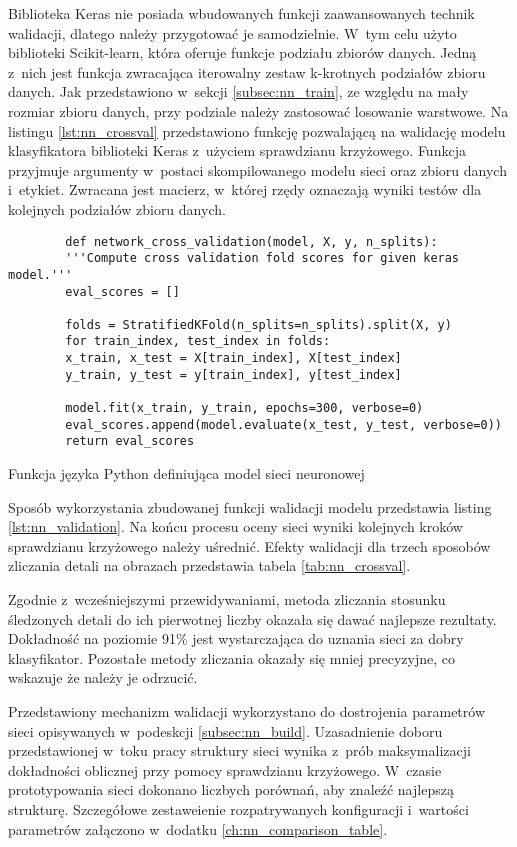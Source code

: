 Biblioteka Keras nie posiada wbudowanych funkcji zaawansowanych technik
walidacji, dlatego należy przygotować je samodzielnie.
W~tym celu użyto biblioteki Scikit-learn, która oferuje funkcje podziału
zbiorów danych.
Jedną z~nich jest funkcja zwracająca iterowalny zestaw k-krotnych
podziałów zbioru danych.
Jak przedstawiono w~sekcji \ref{subsec:nn_train}, ze względu na mały rozmiar
zbioru danych, przy podziale należy zastosować losowanie warstwowe.
Na listingu \ref{lst:nn_crossval} przedstawiono funkcję pozwalającą na
walidację modelu klasyfikatora biblioteki Keras z~użyciem sprawdzianu
krzyżowego.
Funkcja przyjmuje argumenty w~postaci skompilowanego modelu sieci oraz
zbioru danych i~etykiet.
Zwracana jest macierz, w~której rzędy oznaczają wyniki testów dla kolejnych
podziałów zbioru danych.
\begin{listing}[htb]
	\begin{verbatim}
		def network_cross_validation(model, X, y, n_splits):
		'''Compute cross validation fold scores for given keras model.'''
		eval_scores = []

		folds = StratifiedKFold(n_splits=n_splits).split(X, y)
		for train_index, test_index in folds:
		x_train, x_test = X[train_index], X[test_index]
		y_train, y_test = y[train_index], y[test_index]

		model.fit(x_train, y_train, epochs=300, verbose=0)
		eval_scores.append(model.evaluate(x_test, y_test, verbose=0))
		return eval_scores
	\end{verbatim}
	\caption{Funkcja języka Python definiująca model sieci neuronowej}
	\label{lst:nn_crossval}
\end{listing}
Sposób wykorzystania zbudowanej funkcji walidacji modelu przedstawia
listing \ref{lst:nn_validation}.
Na końcu procesu oceny sieci wyniki kolejnych kroków sprawdzianu krzyżowego
należy uśrednić.
Efekty walidacji dla trzech sposobów zliczania detali na obrazach przedstawia
tabela \ref{tab:nn_crossval}.

Zgodnie z~wcześniejszymi przewidywaniami, metoda zliczania stosunku śledzonych
detali do ich pierwotnej liczby okazała się dawać najlepsze rezultaty.
Dokładność na poziomie 91\% jest wystarczająca do uznania sieci za dobry
klasyfikator.
Pozostałe metody zliczania okazały się mniej precyzyjne, co wskazuje że należy
je odrzucić.

Przedstawiony mechanizm walidacji wykorzystano do dostrojenia parametrów
sieci opisywanych w~podeskcji \ref{subsec:nn_build}.
Uzasadnienie doboru przedstawionej w~toku pracy struktury sieci wynika z~prób
maksymalizacji dokładności oblicznej przy pomocy sprawdzianu krzyżowego.
W~czasie prototypowania sieci dokonano liczbych porównań, aby znaleźć
najlepszą strukturę.
Szczegółowe zestaweienie rozpatrywanych konfiguracji i~wartości parametrów
załączono w~dodatku \ref{ch:nn_comparison_table}.

